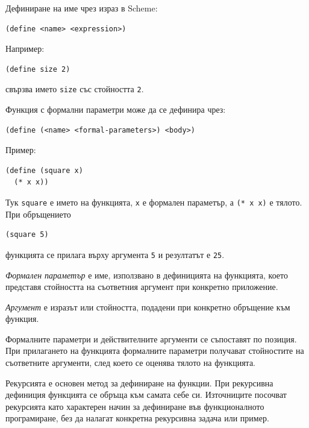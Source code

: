 Дефиниране на име чрез израз в Scheme:

\begin{verbatim}
(define <name> <expression>)
\end{verbatim}

Например:

\begin{verbatim}
(define size 2)
\end{verbatim}

свързва името \texttt{size} със стойността \texttt{2}.

Функция с формални параметри може да се дефинира чрез:

\begin{verbatim}
(define (<name> <formal-parameters>) <body>)
\end{verbatim}

Пример:

\begin{verbatim}
(define (square x)
  (* x x))
\end{verbatim}

Тук \texttt{square} е името на функцията, \texttt{x} е формален параметър, а \texttt{(* x x)} е тялото. При обръщението

\begin{verbatim}
(square 5)
\end{verbatim}

функцията се прилага върху аргумента \texttt{5} и резултатът е \texttt{25}.

\begin{defn}
\emph{Формален параметър} е име, използвано в дефиницията на функцията, което представя стойността на съответния аргумент при конкретно приложение.
\end{defn}

\begin{defn}
\emph{Аргумент} е изразът или стойността, подадени при конкретно обръщение към функция.
\end{defn}

Формалните параметри и действителните аргументи се съпоставят по позиция. При прилагането на функцията формалните параметри получават стойностите на съответните аргументи, след което се оценява тялото на функцията.

Рекурсията е основен метод за дефиниране на функции. При рекурсивна дефиниция функцията се обръща към самата себе си. Източниците посочват рекурсията като характерен начин за дефиниране във функционалното програмиране, без да налагат конкретна рекурсивна задача или пример.

